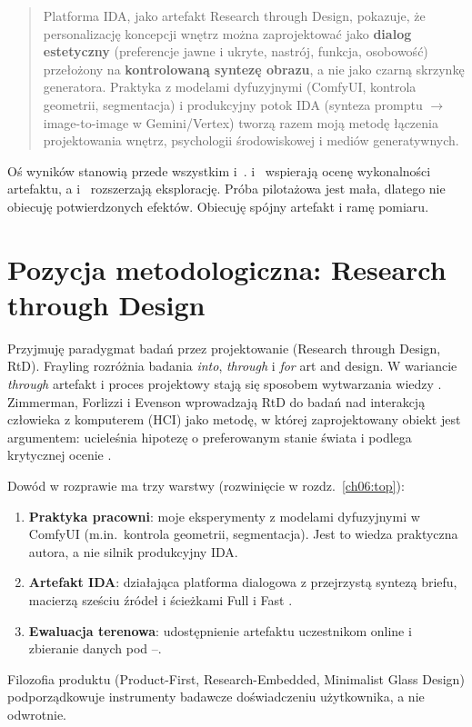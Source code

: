 \begin{quote}
Platforma IDA, jako artefakt Research through Design, pokazuje, że personalizację koncepcji wnętrz można zaprojektować jako \textbf{dialog estetyczny} (preferencje jawne i ukryte, nastrój, funkcja, osobowość) przełożony na \textbf{kontrolowaną syntezę obrazu}, a nie jako czarną skrzynkę generatora.
Praktyka z modelami dyfuzyjnymi (ComfyUI, kontrola geometrii, segmentacja) i produkcyjny potok IDA (synteza promptu $\rightarrow$ image-to-image w Gemini/Vertex) tworzą razem moją metodę łączenia projektowania wnętrz, psychologii środowiskowej i mediów generatywnych.
\end{quote}

Oś wyników stanowią przede wszystkim  i~.  i~ wspierają ocenę wykonalności artefaktu, a  i~ rozszerzają eksplorację.
Próba pilotażowa jest mała, dlatego nie obiecuję potwierdzonych efektów. Obiecuję spójny artefakt i ramę pomiaru.

\section{Pozycja metodologiczna: Research through Design}
\label{ch01:sec:rtd}

Przyjmuję paradygmat badań przez projektowanie (Research through Design, RtD).
Frayling rozróżnia badania \emph{into}, \emph{through} i \emph{for} art and design. W wariancie \emph{through} artefakt i proces projektowy stają się sposobem wytwarzania wiedzy \parencite{frayling1993research}.
Zimmerman, Forlizzi i Evenson wprowadzają RtD do badań nad interakcją człowieka z komputerem (HCI) jako metodę, w której zaprojektowany obiekt jest argumentem: ucieleśnia hipotezę o preferowanym stanie świata i podlega krytycznej ocenie \parencite{zimmerman2007rtd}.

Dowód w rozprawie ma trzy warstwy (rozwinięcie w rozdz.~\ref{ch06:top}):
\begin{enumerate}
  \item[(A)] \textbf{Praktyka pracowni}: moje eksperymenty z modelami dyfuzyjnymi w ComfyUI (m.in.\ kontrola geometrii, segmentacja). Jest to wiedza praktyczna autora, a nie silnik produkcyjny IDA.
  \item[(B)] \textbf{Artefakt IDA}: działająca platforma dialogowa z przejrzystą syntezą briefu, macierzą sześciu źródeł i ścieżkami Full i Fast \parencite{idaPlatform2026}.
  \item[(C)] \textbf{Ewaluacja terenowa}: udostępnienie artefaktu uczestnikom online i zbieranie danych pod --.
\end{enumerate}
Filozofia produktu (Product-First, Research-Embedded, Minimalist Glass Design) podporządkowuje instrumenty badawcze doświadczeniu użytkownika, a nie odwrotnie.

